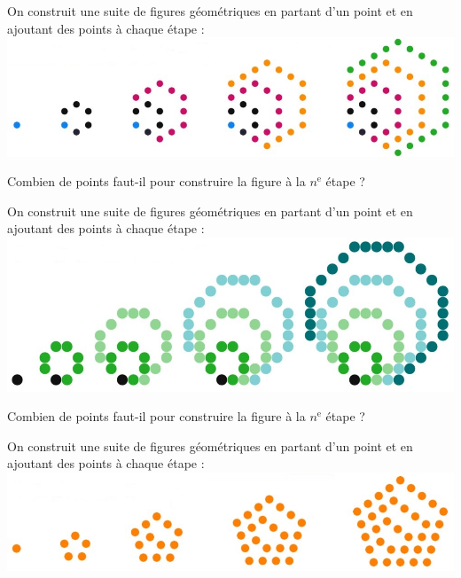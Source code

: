 \documentclass[a4paper,11pt,exos]{nsi} %
\begin{document}
\maketitle

On construit une suite de figures géométriques en partant d'un point et en ajoutant des points à chaque étape :\\
\includegraphics[width=17cm]{Nb_hexagonaux.jpg}

Combien de points faut-il pour construire la figure à la $n^{\text{e}}$ étape ?\\

\vspace*{3cm}

\maketitle

On construit une suite de figures géométriques en partant d'un point et en ajoutant des points à chaque étape :\\
\includegraphics[width=17cm]{Nb_octogonaux.jpg}

Combien de points faut-il pour construire la figure à la $n^{\text{e}}$ étape ?\\

\newpage

\maketitle

On construit une suite de figures géométriques en partant d'un point et en ajoutant des points à chaque étape :\\
\includegraphics[width=17cm]{Nb_pentagonaux.jpg}
\end{document}
